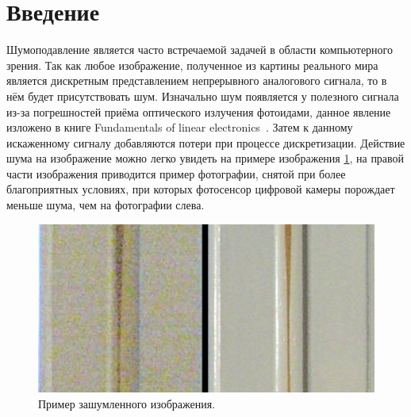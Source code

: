 \documentclass[14pt]{mmcs_article}
\begin{document}

\renewcommand{\contentsname}{Оглавление}

\tableofcontents


\newpage
{}
\section*{Введение}

Шумоподавление является часто встречаемой задачей в области компьютерного зрения. Так как любое изображение, полученное из картины реального мира является дискретным представлением непрерывного аналогового сигнала, то в нём будет присутствовать шум. Изначально шум появляется у полезного сигнала из-за погрешностей приёма оптического излучения фотоидами, данное явление изложено в книге Fundamentals of linear electronics~\autocite{HardwareImageNoise}. Затем к данному искаженному сигналу добавляются потери при процессе дискретизации. Действие шума на изображение можно легко увидеть на примере изображения \ref{fig:noise_compration}, на правой части изображения приводится пример фотографии, снятой при более благоприятных условиях, при которых фотосенсор цифровой камеры порождает меньше шума, чем на фотографии слева. 

\begin{figure}[h]
	\centering
	\includegraphics[width=\textwidth]{img/Noise_Comparison}
	\caption{Пример зашумленного изображения.}
	\label{fig:noise_compration}
\end{figure}
\end{document}
